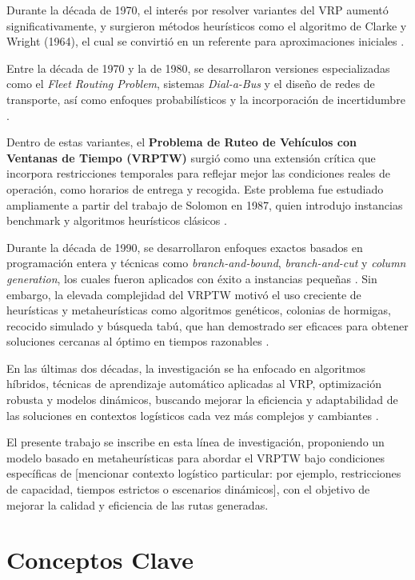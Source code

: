 \documentclass[12pt,titlepage,twoside,openright]{book}
\begin{document}
Durante la década de 1970, el interés por resolver variantes del VRP aumentó significativamente, y surgieron métodos heurísticos como el algoritmo de Clarke y Wright (1964), el cual se convirtió en un referente para aproximaciones iniciales \citep{clarke1964scheduling}.

Entre la década de 1970 y la de 1980, se desarrollaron versiones especializadas como el \textit{Fleet Routing Problem}, sistemas \textit{Dial-a-Bus} y el diseño de redes de transporte, así como enfoques probabilísticos y la incorporación de incertidumbre \citep{eksioglu2009, golden1988, laporte1992}.

Dentro de estas variantes, el \textbf{Problema de Ruteo de Vehículos con Ventanas de Tiempo (VRPTW)} surgió como una extensión crítica que incorpora restricciones temporales para reflejar mejor las condiciones reales de operación, como horarios de entrega y recogida. Este problema fue estudiado ampliamente a partir del trabajo de Solomon en 1987, quien introdujo instancias benchmark y algoritmos heurísticos clásicos \citep{solomon1987algorithms}.

Durante la década de 1990, se desarrollaron enfoques exactos basados en programación entera y técnicas como \textit{branch-and-bound}, \textit{branch-and-cut} y \textit{column generation}, los cuales fueron aplicados con éxito a instancias pequeñas \citep{desrochers1992, cordeau2002}. Sin embargo, la elevada complejidad del VRPTW motivó el uso creciente de heurísticas y metaheurísticas como algoritmos genéticos, colonias de hormigas, recocido simulado y búsqueda tabú, que han demostrado ser eficaces para obtener soluciones cercanas al óptimo en tiempos razonables \citep{eksioglu2009}.

En las últimas dos décadas, la investigación se ha enfocado en algoritmos híbridos, técnicas de aprendizaje automático aplicadas al VRP, optimización robusta y modelos dinámicos, buscando mejorar la eficiencia y adaptabilidad de las soluciones en contextos logísticos cada vez más complejos y cambiantes \citep{toth2014}.

El presente trabajo se inscribe en esta línea de investigación, proponiendo un modelo basado en metaheurísticas para abordar el VRPTW bajo condiciones específicas de [mencionar contexto logístico particular: por ejemplo, restricciones de capacidad, tiempos estrictos o escenarios dinámicos], con el objetivo de mejorar la calidad y eficiencia de las rutas generadas.

\section{Conceptos Clave}
\end{document}
